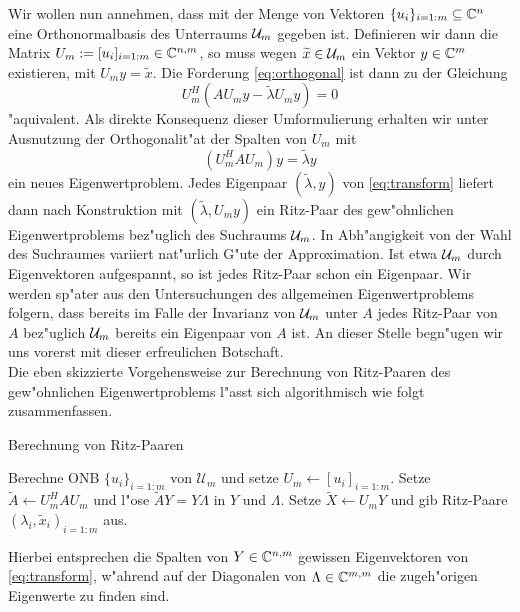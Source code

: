 Wir wollen nun annehmen, dass mit der Menge von Vektoren $\{u_i\}_{i=1:m}\subseteq \mathbb{C}^n$ eine Orthonormalbasis
des Unterraums $\mathcal{U}_m$ gegeben ist. Definieren wir dann die Matrix $U_m :=[u_i]_{i=1:m}\in\mathbb{C}^{n,m}$, so muss wegen $\widetilde{x}\in\mathcal{U}_m$
ein Vektor $y\in\mathbb{C}^m$ existieren, mit $U_m y = \widetilde{x}$. Die Forderung \eqref{eq:orthogonal}
ist dann zu der Gleichung
\[
U_m^H(AU_m y - \widetilde{\lambda} U_m y) = 0
\]
"aquivalent. Als direkte Konsequenz dieser Umformulierung erhalten wir unter Ausnutzung
der Orthogonalit"at der Spalten von $U_m$ mit
\begin{equation}\label{eq:transform}
(U_m^H A U_m) y = \widetilde{\lambda}y
\end{equation}
ein neues Eigenwertproblem. Jedes Eigenpaar $(\widetilde{\lambda},y)$ von \eqref{eq:transform}
liefert dann nach Konstruktion mit $(\widetilde{\lambda}, U_m y)$ ein Ritz-Paar des gew"ohnlichen
Eigenwertproblems bez"uglich des Suchraums $\mathcal{U}_m$. In Abh"angigkeit von der Wahl
des Suchraumes variiert nat"urlich G"ute der Approximation. Ist etwa $\mathcal{U}_m$
durch Eigenvektoren aufgespannt, so ist jedes Ritz-Paar schon ein Eigenpaar.
Wir werden sp"ater aus den Untersuchungen des allgemeinen Eigenwertproblems folgern,
dass bereits im Falle der Invarianz von $\mathcal{U}_m$ unter $A$ jedes Ritz-Paar von $A$ bez"uglich $\mathcal{U}_m$ bereits ein Eigenpaar von $A$ ist.
An dieser Stelle begn"ugen wir uns vorerst mit dieser erfreulichen Botschaft.\\

Die eben skizzierte Vorgehensweise zur Berechnung von Ritz-Paaren des gew"ohnlichen Eigenwertproblems
l"asst sich algorithmisch wie folgt zusammenfassen.

\begin{algorithm}\label{alg:rp}
\caption{Berechnung von Ritz-Paaren}
\begin{algorithmic}[1]
\State Berechne ONB $\{u_i\}_{i=1:m}$ von $\mathcal{U}_m$ und setze $U_m\gets[u_i]_{i=1:m}$.
\State Setze $\widetilde{A}\gets U_m^H A U_m$ und
l"ose $\widetilde{A}Y = Y \Lambda$ in $Y$ und
$\Lambda$.
\State Setze $\widetilde{X} \gets U_m Y$ und gib Ritz-Paare $(\lambda_i, \widetilde{x}_i)_{i=1:m}$ aus.
\end{algorithmic}
\end{algorithm}

Hierbei entsprechen die Spalten von $Y\in\mathbb{C}^{n,m}$ gewissen Eigenvektoren von \eqref{eq:transform}, w"ahrend auf der Diagonalen von $\Lambda\in\mathbb{C}^{m,m}$
die zugeh"origen Eigenwerte zu finden sind.\\

